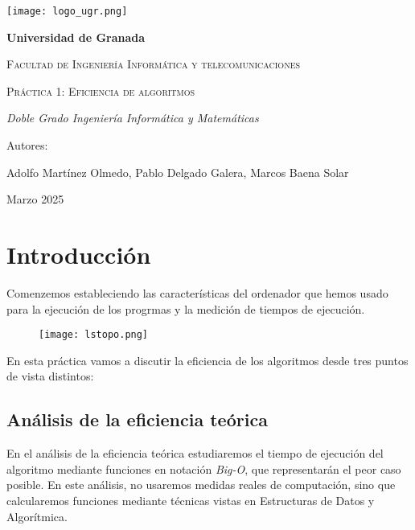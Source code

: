 \documentclass[a4paper,12pt]{article} %
\begin{document}
\begin{titlepage}
	\centering

	\texttt{[image: logo\_ugr.png]} %
	\vspace{1cm} %

	{\bfseries\LARGE Universidad de Granada \par}
	\vspace{1cm}
	{\scshape\Large Facultad de Ingeniería Informática y telecomunicaciones \par}
	\vspace{3cm}
	{\scshape\Huge Práctica 1: Eficiencia de algoritmos \par}
	\vspace{3cm}
	{\itshape\Large Doble Grado Ingeniería Informática y Matemáticas \par}
	\vfill
	{\Large Autores: \par}
	{\Large Adolfo Martínez Olmedo, Pablo Delgado Galera, Marcos Baena Solar \par}
	\vfill
	{\Large Marzo 2025 \par}
\end{titlepage}

\tableofcontents
\newpage


\section{Introducción}
Comenzemos estableciendo las características del ordenador que hemos usado para la
ejecución de los progrmas y la medición de tiempos de ejecución.

\begin{figure}[htbp]
	\centering
	\texttt{[image: lstopo.png]}
	\label{fig:lstopo}
\end{figure}


En esta práctica vamos a discutir la eficiencia de los algoritmos
desde tres puntos de vista distintos:


\subsection{Análisis de la eficiencia teórica}
En el análisis de la eficiencia teórica estudiaremos el tiempo de ejecución del algoritmo
mediante funciones en notación \textit{Big-O}, que representarán el peor caso posible.
En este análisis, no usaremos medidas reales de computación, sino que calcularemos funciones
mediante técnicas vistas en Estructuras de Datos y Algorítmica.
\end{document}
